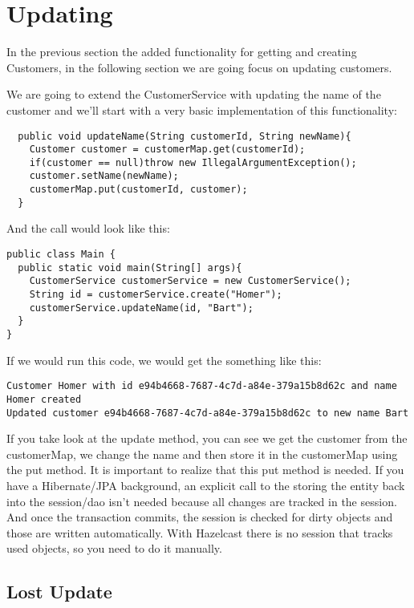 \section{Updating}

In the previous section the added functionality for getting and creating Customers, in the following section we are going focus on updating customers. 

We are going to extend the CustomerService with updating the name of the customer and we'll start with a very basic implementation of this functionality:

\begin{verbatim}
  public void updateName(String customerId, String newName){
    Customer customer = customerMap.get(customerId);
    if(customer == null)throw new IllegalArgumentException();
    customer.setName(newName);
    customerMap.put(customerId, customer);
  }
\end{verbatim}

And the call would look like this:

\begin{verbatim}
public class Main {
  public static void main(String[] args){
    CustomerService customerService = new CustomerService();
    String id = customerService.create("Homer");
    customerService.updateName(id, "Bart");
  }
}
\end{verbatim}

If we would run this code, we would get the something like this:

\begin{verbatim}
Customer Homer with id e94b4668-7687-4c7d-a84e-379a15b8d62c and name Homer created
Updated customer e94b4668-7687-4c7d-a84e-379a15b8d62c to new name Bart
\end{verbatim}

If you take look at the update method, you can see we get the customer from the customerMap, we change the name and then store it in the customerMap using the put method. It is important to realize that this put method is needed. If you have a Hibernate/JPA background, an explicit call to the storing the entity back into the session/dao isn't needed because all changes are tracked in the session. And once the transaction commits, the session is checked for dirty objects and those are written automatically. With Hazelcast there is no session that tracks used objects, so you need to do it manually. 

\subsection{Lost Update}

